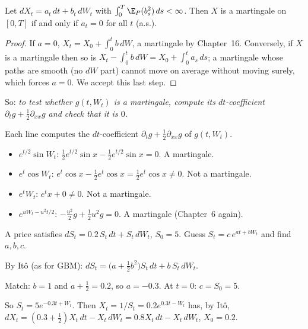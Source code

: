 \begin{theorem}
\label{thm:drift-zero}
Let $dX_t=a_t\,dt+b_t\,dW_t$ with $\int_0^T\E_P(b_s^2)\,ds<\infty$. Then $X$ is a martingale on $[0,T]$ if and only if $a_t=0$ for all $t$ (a.s.).
\end{theorem}
\begin{proof}
If $a=0$, $X_t=X_0+\int_0^tb\,dW$, a martingale by Chapter~16. Conversely, if $X$ is a martingale then so is $X_t-\int_0^tb\,dW=X_0+\int_0^ta_s\,ds$; a martingale whose paths are smooth (no $dW$ part) cannot move on average without moving surely, which forces $a=0$. We accept this last step.
\end{proof}

So: \emph{to test whether $g(t,W_t)$ is a martingale, compute its $dt$-coefficient $\partial_tg+\frac12\partial_{xx}g$ and check that it is $0$.}

\begin{example}
\label{ex:mg-test}
Each line computes the $dt$-coefficient $\partial_tg+\frac12\partial_{xx}g$ of $g(t,W_t)$.
\begin{itemize}
  \item $e^{t/2}\sin W_t$: $\frac12e^{t/2}\sin x-\frac12e^{t/2}\sin x=0$. A martingale.
  \item $e^{t}\cos W_t$: $e^t\cos x-\frac12e^t\cos x=\frac12e^t\cos x\ne0$. Not a martingale.
  \item $e^tW_t$: $e^tx+0\ne0$. Not a martingale.
  \item $e^{uW_t-u^2t/2}$: $-\frac{u^2}2g+\frac12u^2g=0$. A martingale (Chapter~6 again).
\end{itemize}
\end{example}

\begin{example}
\label{ex:guess}
A price satisfies $dS_t=0.2\,S_t\,dt+S_t\,dW_t$, $S_0=5$. Guess $S_t=c\,e^{at+bW_t}$ and find $a,b,c$.
\begin{steps}
  \item By Itô (as for GBM): $dS_t=\big(a+\frac12b^2\big)S_t\,dt+b\,S_t\,dW_t$.
  \item Match: $b=1$ and $a+\frac12=0.2$, so $a=-0.3$. At $t=0$: $c=S_0=5$.
  \item So $S_t=5e^{-0.3t+W_t}$. Then $X_t=1/S_t=0.2e^{0.3t-W_t}$ has, by Itô, $dX_t=(0.3+\frac12)X_t\,dt-X_t\,dW_t=0.8X_t\,dt-X_t\,dW_t$, $X_0=0.2$.
\end{steps}
\end{example}


